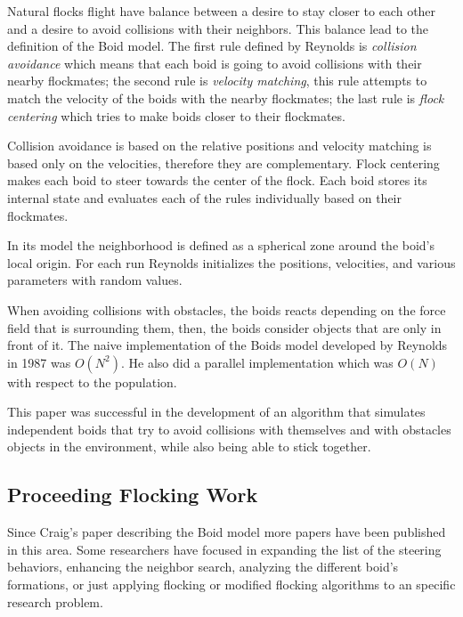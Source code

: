 Natural flocks flight have balance between  a desire to stay closer to each other and a desire to avoid collisions with their neighbors. This balance lead to the definition of the Boid model. The first rule defined by Reynolds is \textit{collision avoidance} which means that each boid is going to avoid collisions with their nearby flockmates; the second rule is \textit{velocity matching}, this rule attempts to match the velocity of the boids with the nearby flockmates; the last rule is \textit{flock centering} which tries to make boids closer to their flockmates.

Collision avoidance is based on the relative positions and velocity matching is based only on the velocities, therefore they are complementary. Flock centering makes each boid to steer towards the center of the flock. Each boid stores its internal state and evaluates each of the rules individually based on their flockmates. 

In its model the neighborhood is defined as a spherical zone around the boid's local origin. For each run Reynolds initializes the positions, velocities, and various parameters with random values. 

When avoiding collisions with obstacles, the boids reacts depending on the force field that is surrounding them, then, the boids consider objects that are only in front of it. The naive implementation of the Boids model developed by Reynolds in 1987 was $O(N^2)$. He also did a parallel implementation which was $O(N)$ with respect to the population.

This paper was successful in the development of an algorithm that simulates independent boids that try to avoid collisions with themselves and with obstacles objects in the environment, while also being able to stick together.

\subsection{Proceeding Flocking Work}\label{currentwork}
Since Craig's paper describing the Boid model more papers have been published in this area. Some researchers have focused in expanding the list of the steering behaviors, enhancing the neighbor search, analyzing the different boid's formations, or just applying flocking or modified flocking algorithms to an specific research problem.

